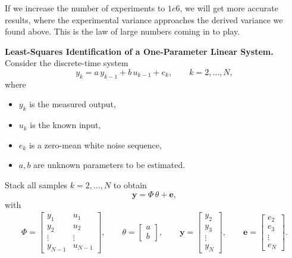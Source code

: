 \documentclass[12pt,a4paper, onecolumn]{exam}
\begin{document}
\begin{questions}
\begin{parts}
\begin{solution}
    If we increase the number of experiments to $ 1e6 $, we will get more accurate results, where the experimental variance approaches the derived variance we found above. This is the law of large numbers coming in to play. 
    
  \end{solution}
\end{parts}

\question[20] \textbf{Least-Squares Identification of a One-Parameter Linear System.}
Consider the discrete-time system
\[
y_k = a\,y_{k-1} + b\,u_{k-1} + e_k, \qquad k = 2, \ldots, N,
\]
where
\begin{itemize}
  \item \(y_k\) is the measured output,
  \item \(u_k\) is the known input,
  \item \(e_k\) is a zero-mean white noise sequence,
  \item \(a,b\) are unknown parameters to be estimated.
\end{itemize}
Stack all samples \(k=2,\ldots,N\) to obtain
\[
\mathbf{y} = \Phi\,\theta + \mathbf{e},
\]
with
\begin{align}
\Phi =
\begin{bmatrix}
y_1 & u_1\\
y_2 & u_2\\
\vdots & \vdots\\
y_{N-1} & u_{N-1}
\end{bmatrix},
\qquad
\theta =
\begin{bmatrix}
a\\
b
\end{bmatrix},
\qquad
\mathbf{y} =
\begin{bmatrix}
y_2\\
y_3\\
\vdots\\
y_N
\end{bmatrix},
\qquad
\mathbf{e} =
\begin{bmatrix}
e_2\\
e_3\\
\vdots\\
e_N
\end{bmatrix}.
\label{eq:model}
\end{align}

\end{questions}
\end{document}
